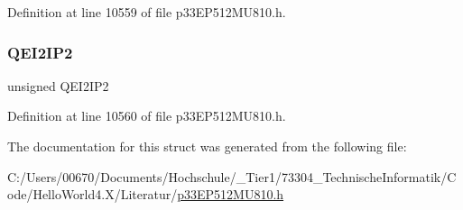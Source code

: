 Definition at line 10559 of file p33\+E\+P512\+M\+U810.\+h.

\mbox{\label{structtag_i_p_c18_b_i_t_s_a9be23f0b4c92949a6e7c7c2cc83e0617}} 
\subsubsection{\texorpdfstring{Q\+E\+I2\+I\+P2}{QEI2IP2}}
{\footnotesize\ttfamily unsigned Q\+E\+I2\+I\+P2}



Definition at line 10560 of file p33\+E\+P512\+M\+U810.\+h.



The documentation for this struct was generated from the following file\+:\begin{DoxyCompactItemize}
\item 
C\+:/\+Users/00670/\+Documents/\+Hochschule/\+\_\+\+Tier1/73304\+\_\+\+Technische\+Informatik/\+Code/\+Hello\+World4.\+X/\+Literatur/\hyperlink{p33_e_p512_m_u810_8h}{p33\+E\+P512\+M\+U810.\+h}\end{DoxyCompactItemize}

